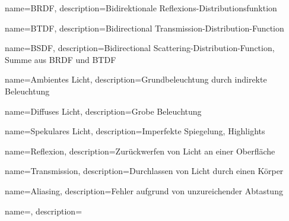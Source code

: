{
  name=BRDF,
  description={Bidirektionale Reflexions-Distributionsfunktion}
}

{
  name=BTDF,
  description={Bidirectional Transmission-Distribution-Function}
}

{
  name=BSDF,
  description={Bidirectional Scattering-Distribution-Function, Summe aus BRDF und BTDF}
}

{
  name=Ambientes Licht,
  description={Grundbeleuchtung durch indirekte Beleuchtung}
}

{
  name=Diffuses Licht,
  description={Grobe Beleuchtung}
}

{
  name=Spekulares Licht,
  description={Imperfekte Spiegelung, Highlights}
}

{
  name=Reflexion,
  description={Zurückwerfen von Licht an einer Oberfläche}
}

{
  name=Transmission,
  description={Durchlassen von Licht durch einen Körper}
}

{
  name=Aliasing,
  description={Fehler aufgrund von unzureichender Abtastung}
}

\newglossaryentry{}
{
  name=,
  description={}
}